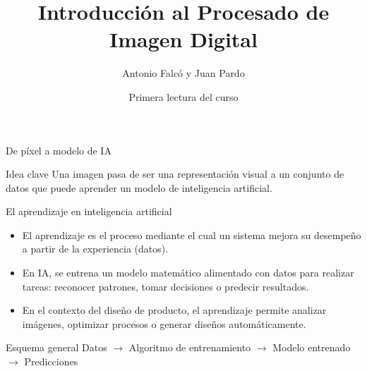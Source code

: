 \documentclass[10pt]{beamer}
\title{Introducci\'on al Procesado de Imagen Digital}
\author{Antonio Falc\'o y Juan Pardo}
\institute{Introducci\'on a la Inteligencia Artificial}
\date{Primera lectura del curso}
\begin{document}
\begin{frame}
  \titlepage
\end{frame}

\begin{frame}{De p\'ixel a modelo de IA}
\centering
{}
\vspace{4mm}
\begin{block}{Idea clave}
Una imagen pasa de ser una representaci\'on visual a un conjunto de datos que puede aprender un modelo de inteligencia artificial.
\end{block}
\end{frame}

\begin{frame}{El aprendizaje en inteligencia artificial}
\begin{itemize}
  \item El aprendizaje es el proceso mediante el cual un sistema mejora su desempe\~no a partir de la experiencia (datos).
  \item En IA, se entrena un modelo matem\'atico alimentado con datos para realizar tareas: reconocer patrones, tomar decisiones o predecir resultados.
  \item En el contexto del dise\~no de producto, el aprendizaje permite analizar im\'agenes, optimizar procesos o generar dise\~nos autom\'aticamente.
\end{itemize}
\vspace{3mm}
\begin{block}{Esquema general}
\centering
Datos $\rightarrow$ Algoritmo de entrenamiento $\rightarrow$ Modelo entrenado $\rightarrow$ Predicciones
\end{block}
\end{frame}
\end{document}
